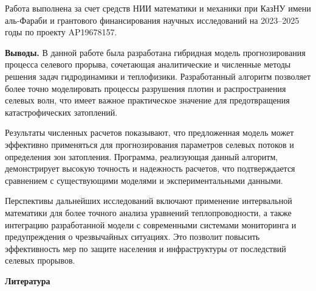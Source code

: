 Работа выполнена за счет средств НИИ математики и механики при КазНУ
имени аль-Фараби и грантового финансирования научных исследований на
2023--2025 годы по проекту AP19678157.

\textbf{Выводы.} В данной работе была разработана гибридная модель
прогнозирования процесса селевого прорыва, сочетающая аналитические и
численные методы решения задач гидродинамики и теплофизики.
Разработанный алгоритм позволяет более точно моделировать процессы
разрушения плотин и распространения селевых волн, что имеет важное
практическое значение для предотвращения катастрофических затоплений.

Результаты численных расчетов показывают, что предложенная модель может
эффективно применяться для прогнозирования параметров селевых потоков и
определения зон затопления. Программа, реализующая данный алгоритм,
демонстрирует высокую точность и надежность расчетов, что подтверждается
сравнением с существующими моделями и экспериментальными данными.

Перспективы дальнейших исследований включают применение интервальной
математики для более точного анализа уравнений теплопроводности, а также
интеграцию разработанной модели с современными системами мониторинга и
предупреждения о чрезвычайных ситуациях. Это позволит повысить
эффективность мер по защите населения и инфраструктуры от последствий
селевых прорывов.

\textbf{Литература}

